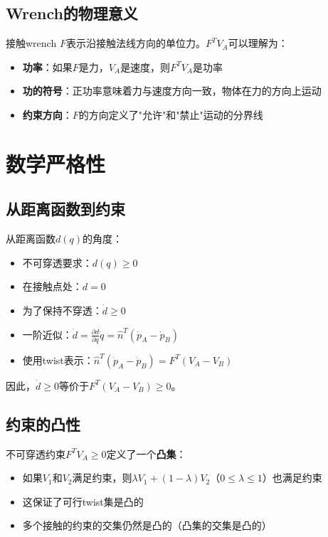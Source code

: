 \documentclass[12pt,a4paper]{article}
\begin{document}
\subsection{Wrench的物理意义}

接触wrench $F$表示沿接触法线方向的单位力。$F^T V_A$可以理解为：

\begin{itemize}
\item \textbf{功率}：如果$F$是力，$V_A$是速度，则$F^T V_A$是功率
\item \textbf{功的符号}：正功率意味着力与速度方向一致，物体在力的方向上运动
\item \textbf{约束方向}：$F$的方向定义了"允许"和"禁止"运动的分界线
\end{itemize}

\section{数学严格性}

\subsection{从距离函数到约束}

从距离函数$d(q)$的角度：

\begin{itemize}
\item 不可穿透要求：$d(q) \geq 0$
\item 在接触点处：$d = 0$
\item 为了保持不穿透：$\dot{d} \geq 0$
\item 一阶近似：$\dot{d} = \frac{\partial d}{\partial q} \dot{q} = \hat{n}^T (\dot{p}_A - \dot{p}_B)$
\item 使用twist表示：$\hat{n}^T (\dot{p}_A - \dot{p}_B) = F^T (V_A - V_B)$
\end{itemize}

因此，$\dot{d} \geq 0$等价于$F^T (V_A - V_B) \geq 0$。

\subsection{约束的凸性}

不可穿透约束$F^T V_A \geq 0$定义了一个\textbf{凸集}：

\begin{itemize}
\item 如果$V_1$和$V_2$满足约束，则$\lambda V_1 + (1-\lambda) V_2$（$0 \leq \lambda \leq 1$）也满足约束
\item 这保证了可行twist集是凸的
\item 多个接触的约束的交集仍然是凸的（凸集的交集是凸的）
\end{itemize}
\end{document}
